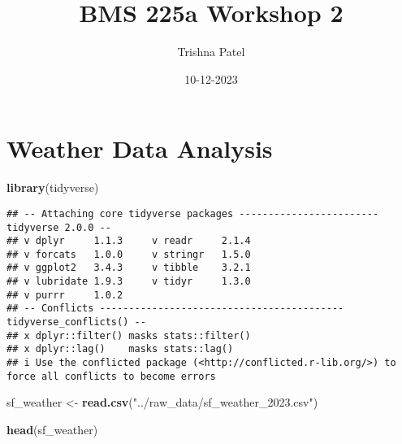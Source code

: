\documentclass[
]{article}
\title{BMS 225a Workshop 2}
\author{Trishna Patel}
\date{10-12-2023}
\newenvironment{Shaded}{\begin{snugshade}}{\end{snugshade}}
\newcommand{\FunctionTok}[1]{\textcolor[rgb]{0.13,0.29,0.53}{\textbf{#1}}}
\newcommand{\NormalTok}[1]{#1}
\newcommand{\OtherTok}[1]{\textcolor[rgb]{0.56,0.35,0.01}{#1}}
\newcommand{\StringTok}[1]{\textcolor[rgb]{0.31,0.60,0.02}{#1}}
\begin{document}
\maketitle

\hypertarget{weather-data-analysis}{%
\section{Weather Data Analysis}\label{weather-data-analysis}}

\begin{Shaded}
\begin{Highlighting}[]
\FunctionTok{library}\NormalTok{(tidyverse)}
\end{Highlighting}
\end{Shaded}

\begin{verbatim}
## -- Attaching core tidyverse packages ------------------------ tidyverse 2.0.0 --
## v dplyr     1.1.3     v readr     2.1.4
## v forcats   1.0.0     v stringr   1.5.0
## v ggplot2   3.4.3     v tibble    3.2.1
## v lubridate 1.9.3     v tidyr     1.3.0
## v purrr     1.0.2     
## -- Conflicts ------------------------------------------ tidyverse_conflicts() --
## x dplyr::filter() masks stats::filter()
## x dplyr::lag()    masks stats::lag()
## i Use the conflicted package (<http://conflicted.r-lib.org/>) to force all conflicts to become errors
\end{verbatim}

\begin{Shaded}
\begin{Highlighting}[]
\NormalTok{sf\_weather }\OtherTok{\textless{}{-}} \FunctionTok{read.csv}\NormalTok{(}\StringTok{"../raw\_data/sf\_weather\_2023.csv"}\NormalTok{)}

\FunctionTok{head}\NormalTok{(sf\_weather)}
\end{Highlighting}
\end{Shaded}
\end{document}
